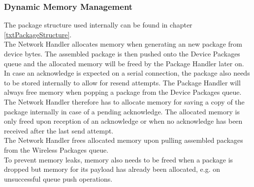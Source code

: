 \subsubsection{Dynamic Memory Management}
The package structure used internally can be found in chapter \autoref{txtPackageStructure}.\\
The Network Handler allocates memory when generating an new package from device bytes. The assembled package is then pushed onto the Device Packages queue and the allocated memory will be freed by the Package Handler later on.\\
In case an acknowledge is expected on a serial connection, the package also needs to be stored internally to allow for resend attempts. The Package Handler will always free memory when popping a package from the Device Packages queue. The Network Handler therefore has to allocate memory for saving a copy of the package internally in case of a pending acknowledge. The allocated memory is only freed upon reception of an acknowledge or when no acknowledge has been received after the last send attempt.\\
The Network Handler frees allocated memory upon pulling assembled packages from the Wireless Packages queue.\\
To prevent memory leaks, memory also needs to be freed when a package is dropped but memory for its payload has already been allocated, e.g. on unsuccessful queue push operations.
